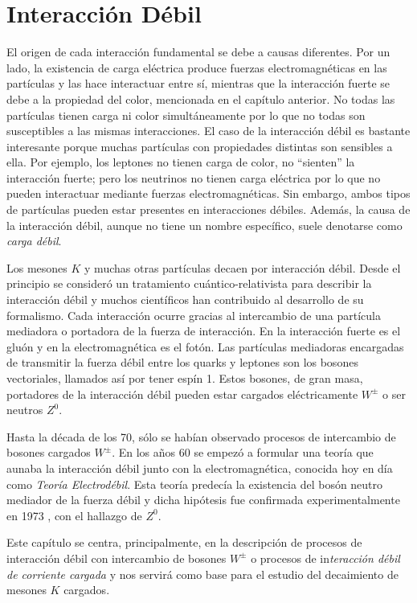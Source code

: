 \chapter{Interacción Débil}\label{cap:weak_int}
El origen de cada interacción fundamental se debe a causas diferentes. Por un lado, la existencia de carga eléctrica produce fuerzas electromagnéticas en las partículas y las hace interactuar entre sí, mientras que la interacción fuerte se debe a la propiedad del color, mencionada en el capítulo anterior. No todas las partículas tienen carga ni color simultáneamente por lo que no todas son susceptibles a las mismas interacciones. El caso de la interacción débil es bastante interesante porque muchas partículas con propiedades distintas son sensibles a ella. Por ejemplo, los leptones no tienen carga de color, no ``sienten'' la interacción fuerte; pero los neutrinos no tienen carga eléctrica por lo que no pueden interactuar mediante fuerzas electromagnéticas. Sin embargo, ambos tipos de partículas pueden estar presentes en interacciones débiles.\cite{Griffiths2008} Además, la causa de la interacción débil, aunque no tiene un nombre específico, suele denotarse como \textit{carga débil}.

Los mesones $K$ y muchas otras partículas decaen por interacción débil. Desde el principio se consideró un tratamiento cuántico-relativista para describir la interacción débil y muchos científicos han contribuido al desarrollo de su formalismo. Cada interacción ocurre gracias al intercambio de una partícula mediadora o portadora de la fuerza de interacción. En la interacción fuerte es el gluón y en la electromagnética es el fotón. Las partículas mediadoras encargadas de transmitir la fuerza débil entre los quarks y leptones son los bosones vectoriales, llamados así por tener espín 1. Estos bosones, de gran masa, portadores de la interacción débil pueden estar cargados eléctricamente $W^{\pm}$ o ser neutros $Z^0$. 

Hasta la década de los 70, sólo se habían observado procesos de intercambio de bosones cargados $W^{\pm}$. En los años 60 se empezó a formular una teoría que aunaba la interacción débil junto con la electromagnética, conocida hoy en día como \textit{Teoría Electrodébil}. Esta teoría predecía la existencia del bosón neutro mediador de la fuerza débil y dicha hipótesis fue confirmada experimentalmente en 1973 \cite{BrianM}, con el hallazgo de $Z^0$.

Este capítulo se centra, principalmente, en la descripción de procesos de interacción débil con intercambio de bosones $W^{\pm}$ o procesos de in\textit{teracción débil de corriente cargada} y nos servirá como base para el estudio del decaimiento de mesones $K$ cargados.


